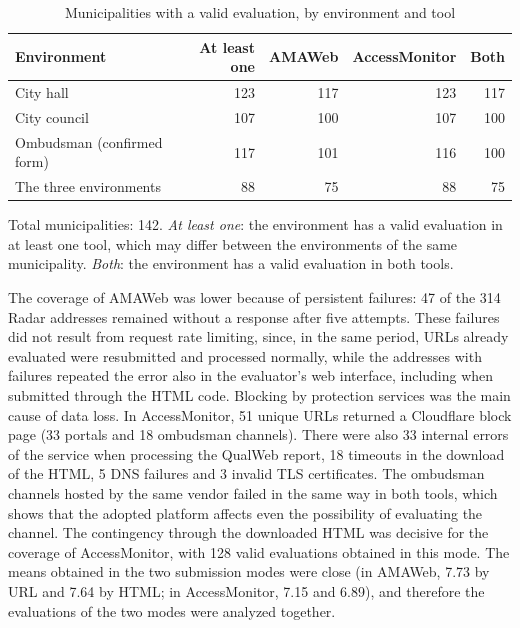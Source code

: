\documentclass[12pt]{article}
\begin{document}
\begin{table}[ht]
\centering
\caption{Municipalities with a valid evaluation, by environment and tool}
\label{tab:amostra}
\footnotesize
\setlength{\tabcolsep}{4pt}
\begin{tabular}{lrrrr}
\toprule
\textbf{Environment} & \textbf{At least one} & \textbf{AMAWeb} & \textbf{AccessMonitor} & \textbf{Both} \\
\midrule
City hall              & 123 & 117 & 123 & 117 \\
City council           & 107 & 100 & 107 & 100 \\
Ombudsman (confirmed form) & 117 & 101 & 116 & 100 \\
\midrule
The three environments &  88 &  75 &  88 &  75 \\
\bottomrule
\end{tabular}

\smallskip
\parbox{0.85\linewidth}{\footnotesize Total municipalities: 142. \textit{At least one}: the environment has a valid evaluation in at least one tool, which may differ between the environments of the same municipality. \textit{Both}: the environment has a valid evaluation in both tools.}
\end{table}

The coverage of AMAWeb was lower because of persistent failures: 47 of the 314 Radar addresses remained without a response after five attempts. These failures did not result from request rate limiting, since, in the same period, URLs already evaluated were resubmitted and processed normally, while the addresses with failures repeated the error also in the evaluator's web interface, including when submitted through the HTML code. Blocking by protection services was the main cause of data loss. In AccessMonitor, 51 unique URLs returned a Cloudflare block page (33 portals and 18 ombudsman channels). There were also 33 internal errors of the service when processing the QualWeb report, 18 timeouts in the download of the HTML, 5 DNS failures and 3 invalid TLS certificates. The ombudsman channels hosted by the same vendor failed in the same way in both tools, which shows that the adopted platform affects even the possibility of evaluating the channel. The contingency through the downloaded HTML was decisive for the coverage of AccessMonitor, with 128 valid evaluations obtained in this mode. The means obtained in the two submission modes were close (in AMAWeb, 7.73 by URL and 7.64 by HTML; in AccessMonitor, 7.15 and 6.89), and therefore the evaluations of the two modes were analyzed together.
\end{document}
